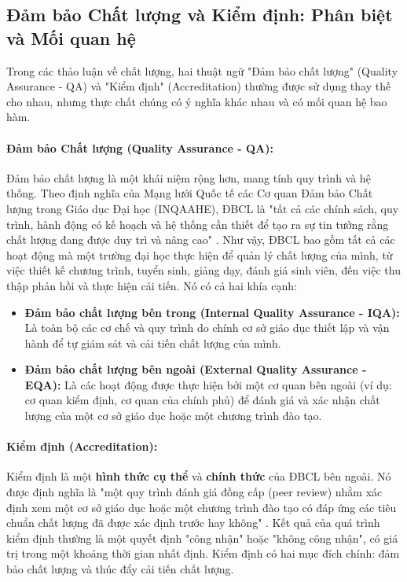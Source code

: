 \documentclass[12pt, a4paper, openany]{report}
\begin{document}
\subsection{Đảm bảo Chất lượng và Kiểm định: Phân biệt và Mối quan hệ}
\label{subsec:khai_niem_dbcl_kd}

Trong các thảo luận về chất lượng, hai thuật ngữ "Đảm bảo chất lượng" (Quality Assurance - QA) và "Kiểm định" (Accreditation) thường được sử dụng thay thế cho nhau, nhưng thực chất chúng có ý nghĩa khác nhau và có mối quan hệ bao hàm.

\paragraph{Đảm bảo Chất lượng (Quality Assurance - QA):}
Đảm bảo chất lượng là một khái niệm rộng hơn, mang tính quy trình và hệ thống. Theo định nghĩa của Mạng lưới Quốc tế các Cơ quan Đảm bảo Chất lượng trong Giáo dục Đại học (INQAAHE), ĐBCL là "tất cả các chính sách, quy trình, hành động có kế hoạch và hệ thống cần thiết để tạo ra sự tin tưởng rằng chất lượng đang được duy trì và nâng cao" \cite{INQAAHE_Glossary}.
Như vậy, ĐBCL bao gồm tất cả các hoạt động mà một trường đại học thực hiện để quản lý chất lượng của mình, từ việc thiết kế chương trình, tuyển sinh, giảng dạy, đánh giá sinh viên, đến việc thu thập phản hồi và thực hiện cải tiến. Nó có cả hai khía cạnh:
\begin{itemize}
    \item \textbf{Đảm bảo chất lượng bên trong (Internal Quality Assurance - IQA):} Là toàn bộ các cơ chế và quy trình do chính cơ sở giáo dục thiết lập và vận hành để tự giám sát và cải tiến chất lượng của mình.
    \item \textbf{Đảm bảo chất lượng bên ngoài (External Quality Assurance - EQA):} Là các hoạt động được thực hiện bởi một cơ quan bên ngoài (ví dụ: cơ quan kiểm định, cơ quan của chính phủ) để đánh giá và xác nhận chất lượng của một cơ sở giáo dục hoặc một chương trình đào tạo.
\end{itemize}

\paragraph{Kiểm định (Accreditation):}
Kiểm định là một \textbf{hình thức cụ thể} và \textbf{chính thức} của ĐBCL bên ngoài. Nó được định nghĩa là "một quy trình đánh giá đồng cấp (peer review) nhằm xác định xem một cơ sở giáo dục hoặc một chương trình đào tạo có đáp ứng các tiêu chuẩn chất lượng đã được xác định trước hay không" \cite{CHEA_Definition}. Kết quả của quá trình kiểm định thường là một quyết định "công nhận" hoặc "không công nhận", có giá trị trong một khoảng thời gian nhất định. Kiểm định có hai mục đích chính: đảm bảo chất lượng và thúc đẩy cải tiến chất lượng.
\end{document}
